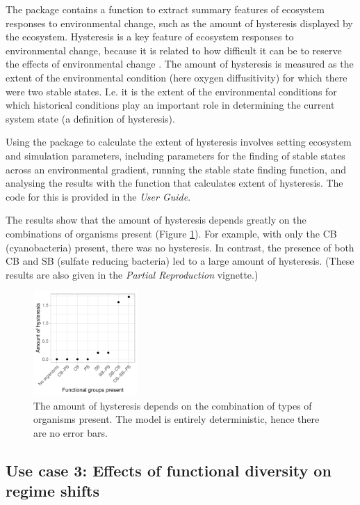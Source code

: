 \documentclass[preprint,12pt, a4paper]{elsarticle}
\begin{document}
The package contains a function to extract summary features of ecosystem
responses to environmental change, such as the amount of hysteresis
displayed by the ecosystem. Hysteresis is a key feature of ecosystem
responses to environmental change, because it is related to how
difficult it can be to reserve the effects of environmental change
\citep{Scheffer2001}. The amount of hysteresis is measured as the extent
of the environmental condition (here oxygen diffusitivity) for which
there were two stable states. I.e. it is the extent of the environmental
conditions for which historical conditions play an important role in
determining the current system state (a definition of hysteresis).

Using the package to calculate the extent of hysteresis involves setting
ecosystem and simulation parameters, including parameters for the
finding of stable states across an environmental gradient, running the
stable state finding function, and analysing the results with the
function that calculates extent of hysteresis. The code for this is
provided in the \emph{User Guide}.

The results show that the amount of hysteresis depends greatly on the
combinations of organisms present (Figure \ref{fig:uc2}). For example,
with only the CB (cyanobacteria) present, there was no hysteresis. In
contrast, the presence of both CB and SB (sulfate reducing bacteria) led
to a large amount of hysteresis. (These results are also given in the
\emph{Partial Reproduction} vignette.)

\begin{figure}

{\centering \includegraphics[width=150px]{figures/gen_uc2_user_guide_hysteresis} 

}

\caption{The amount of hysteresis depends on the combination of types of organisms present. The model is entirely deterministic, hence there are no error bars.}\label{fig:uc2}
\end{figure}

\hypertarget{use-case-3-effects-of-functional-diversity-on-regime-shifts}{%
\subsection{Use case 3: Effects of functional diversity on regime
shifts}\label{use-case-3-effects-of-functional-diversity-on-regime-shifts}}
\end{document}
